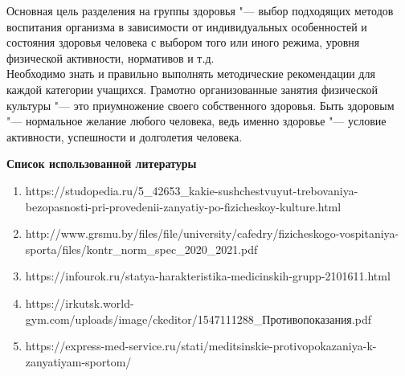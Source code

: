 \begin{flushleft}
Основная цель разделения на группы здоровья "--- выбор подходящих методов воспитания организма
в зависимости от индивидуальных особенностей и состояния здоровья человека с выбором того или иного режима,
уровня физической активности, нормативов и т.д.\\
Необходимо знать и правильно выполнять методические рекомендации для каждой категории учащихся.
Грамотно организованные занятия физической культуры "--- это приумножение своего собственного здоровья.
Быть здоровым "--- нормальное желание любого человека, ведь именно здоровье "--- условие активности, успешности и долголетия человека.
\newpage
\begin{center}
    \textbf{Список использованной литературы}
\end{center}
\vspace*{14pt}

\begin{enumerate}
    \item https://studopedia.ru/5\_42653\_kakie-sushchestvuyut-trebovaniya-bezopasnosti-pri-provedenii-zanyatiy-po-fizicheskoy-kulture.html
    \item http://www.grsmu.by/files/file/university/cafedry/fizicheskogo-vospitaniya-sporta/files/kontr\_norm\_spec\_2020\_2021.pdf
    \item https://infourok.ru/statya-harakteristika-medicinskih-grupp-2101611.html
    \item https://irkutsk.world-gym.com/uploads/image/ckeditor/1547111288\_Противопоказания.pdf
    \item https://express-med-service.ru/stati/meditsinskie-protivopokazaniya-k-zanyatiyam-sportom/
\end{enumerate}
\end{flushleft}